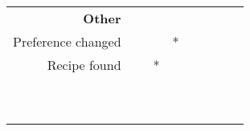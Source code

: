 \begin{table}
\begin{tabular}{|r|c|c|c|c|c|c|}
        \textbf{Other}                         & ~       & ~      & ~    & ~    & ~ & ~ \\ 
        Preference changed                     & ~       & ~      & *    & ~    & ~ & ~ \\ 
        Recipe found                           & ~       & *      & ~    & ~    & ~ & ~ \\ 
        ~                                      & ~       & ~      & ~    & ~    & ~ & ~ \\ 
        ~                                      & ~       & ~      & ~    & ~    & ~ & ~ \\
        \hline
    \end{tabular}
\end{table}